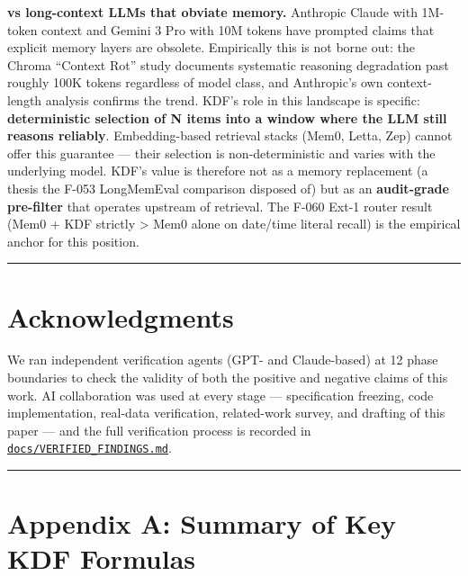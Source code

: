 \textbf{vs long-context LLMs that obviate memory.} Anthropic Claude with 1M-token context and Gemini 3 Pro with 10M tokens have prompted claims that explicit memory layers are obsolete. Empirically this is not borne out: the Chroma ``Context Rot'' study \citep{chromacontextrot2025} documents systematic reasoning degradation past roughly 100K tokens regardless of model class, and Anthropic's own context-length analysis confirms the trend. KDF's role in this landscape is specific: \textbf{deterministic selection of N items into a window where the LLM still reasons reliably}. Embedding-based retrieval stacks (Mem0, Letta, Zep) cannot offer this guarantee --- their selection is non-deterministic and varies with the underlying model. KDF's value is therefore not as a memory replacement (a thesis the F-053 LongMemEval comparison disposed of) but as an \textbf{audit-grade pre-filter} that operates upstream of retrieval. The F-060 Ext-1 router result (Mem0 + KDF strictly \textgreater{} Mem0 alone on date/time literal recall) is the empirical anchor for this position.

\begin{center}\rule{0.5\linewidth}{0.5pt}\end{center}

\section*{Acknowledgments}\label{acknowledgments}

We ran independent verification agents (GPT- and Claude-based) at 12 phase boundaries to check the validity of both the positive and negative claims of this work. AI collaboration was used at every stage --- specification freezing, code implementation, real-data verification, related-work survey, and drafting of this paper --- and the full verification process is recorded in \href{../VERIFIED_FINDINGS.md}{\texttt{docs/VERIFIED\_FINDINGS.md}}.

\begin{center}\rule{0.5\linewidth}{0.5pt}\end{center}

\section*{Appendix A: Summary of Key KDF Formulas}\label{appendix-a-summary-of-key-kdf-formulas}

